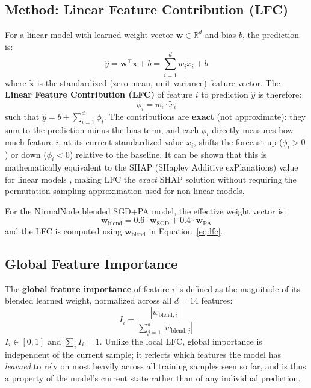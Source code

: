 \subsection{Method: Linear Feature Contribution (LFC)}
\label{sec:meth-xai-lfc}

For a linear model with learned weight vector $\mathbf{w} \in \mathbb{R}^d$ and bias $b$, the prediction is:
\begin{equation}
\hat{y} = \mathbf{w}^\top \tilde{\mathbf{x}} + b = \sum_{i=1}^{d} w_i \tilde{x}_i + b
\label{eq:linear-pred}
\end{equation}
where $\tilde{\mathbf{x}}$ is the standardized (zero-mean, unit-variance) feature vector. The \textbf{Linear Feature Contribution (LFC)} of feature $i$ to prediction $\hat{y}$ is therefore:
\begin{equation}
\phi_i = w_i \cdot \tilde{x}_i
\label{eq:lfc}
\end{equation}
such that $\hat{y} = b + \sum_{i=1}^{d} \phi_i$. The contributions are \textbf{exact} (not approximate): they sum to the prediction minus the bias term, and each $\phi_i$ directly measures how much feature $i$, at its current standardized value $\tilde{x}_i$, shifts the forecast up ($\phi_i > 0$) or down ($\phi_i < 0$) relative to the baseline. It can be shown that this is mathematically equivalent to the SHAP (SHapley Additive exPlanations) value for linear models \citep{lundberg2017shap}, making LFC the \emph{exact} SHAP solution without requiring the permutation-sampling approximation used for non-linear models.

For the NirmalNode blended SGD+PA model, the effective weight vector is:
\begin{equation}
\mathbf{w}_{\mathrm{blend}} = 0.6 \cdot \mathbf{w}_{\mathrm{SGD}} + 0.4 \cdot \mathbf{w}_{\mathrm{PA}}
\label{eq:blend-weight}
\end{equation}
and the LFC is computed using $\mathbf{w}_{\mathrm{blend}}$ in Equation~\ref{eq:lfc}.

\subsection{Global Feature Importance}
\label{sec:meth-xai-global}

The \textbf{global feature importance} of feature $i$ is defined as the magnitude of its blended learned weight, normalized across all $d = 14$ features:
\begin{equation}
I_i = \frac{|w_{\mathrm{blend},i}|}{\sum_{j=1}^{d} |w_{\mathrm{blend},j}|}
\label{eq:global-importance}
\end{equation}
$I_i \in [0,1]$ and $\sum_i I_i = 1$. Unlike the local LFC, global importance is independent of the current sample; it reflects which features the model has \emph{learned} to rely on most heavily across all training samples seen so far, and is thus a property of the model's current state rather than of any individual prediction.

